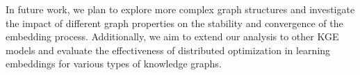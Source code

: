 \documentclass[letterpaper, 10 pt, conference]{ieeeconf}  %
\begin{document}
In future work, we plan to explore more complex graph structures and investigate the impact of different graph properties on the stability and convergence of the embedding process. Additionally, we aim to extend our analysis to other KGE models and evaluate the effectiveness of distributed optimization in learning embeddings for various types of knowledge graphs.




\end{document}
